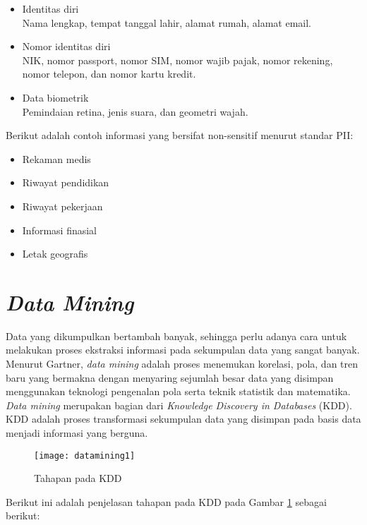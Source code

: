 \begin{itemize}
\item Identitas diri \\ 
Nama lengkap, tempat tanggal lahir, alamat rumah, alamat email.
\item Nomor identitas diri \\
NIK, nomor passport, nomor SIM, nomor wajib pajak, nomor rekening, nomor telepon, dan nomor kartu kredit.
\item Data biometrik \\
Pemindaian retina, jenis suara, dan geometri wajah.
\end{itemize}

\noindent Berikut adalah contoh informasi yang bersifat non-sensitif menurut standar PII:
\begin{itemize}
\item Rekaman medis
\item Riwayat pendidikan
\item Riwayat pekerjaan 
\item Informasi finasial
\item Letak geografis
\end{itemize}

\section{\textit{Data Mining}}
Data yang dikumpulkan bertambah banyak, sehingga perlu adanya cara untuk melakukan proses ekstraksi informasi pada sekumpulan data yang sangat banyak. Menurut Gartner, \textit{data mining} adalah proses menemukan korelasi, pola, dan tren baru yang bermakna dengan menyaring sejumlah besar data yang disimpan menggunakan teknologi pengenalan pola serta teknik statistik dan matematika. \textit{Data mining} merupakan bagian dari \textit{Knowledge Discovery in Databases} (KDD). KDD adalah proses transformasi sekumpulan data yang disimpan pada basis data menjadi informasi yang berguna.\\

\begin{figure}[H]
	\centering
	\texttt{[image: datamining1]}
	\caption{Tahapan pada KDD}
	\label{fig:datamining1}
\end{figure}

\noindent Berikut ini adalah penjelasan tahapan pada KDD pada Gambar \ref{fig:datamining1} sebagai berikut:

